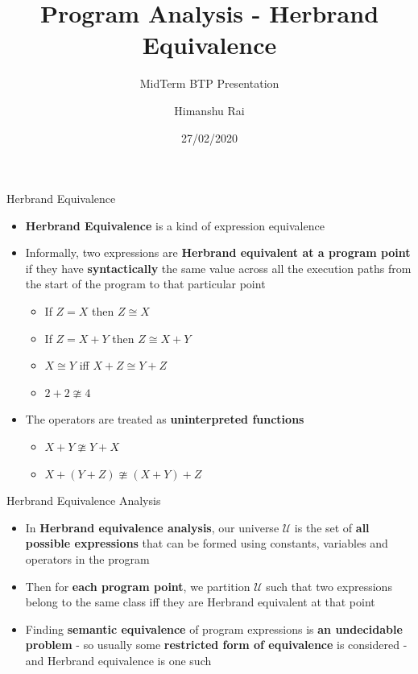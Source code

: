 \documentclass[11pt]{beamer}
\title{Program Analysis - Herbrand Equivalence}
\subtitle{MidTerm BTP Presentation}
\author{Himanshu Rai}
\institute{Indian Institute of Technology, Palakkad}
\date{27/02/2020}
\begin{document}
\begin{frame}
\titlepage
\end{frame}

\begin{frame}{Herbrand Equivalence}
    \begin{itemize}
        \item \textbf{Herbrand Equivalence} is a kind of expression equivalence
        \item Informally, two expressions are \textbf{Herbrand equivalent at a program point} if they have \textbf{syntactically} the same value across all the execution paths from the start of the program to that particular point
        \begin{itemize}
            \item If $Z = X$ then $Z \cong X$
            \item If $Z = X + Y$ then $Z \cong X + Y$
            \item $X \cong Y$ iff $X + Z \cong Y + Z$
            \item $2 + 2 \ncong 4$
        \end{itemize}
        \item The operators are treated as \textbf{uninterpreted functions}
        \begin{itemize}
            \item $X + Y \ncong Y + X$
            \item $X + (Y + Z) \ncong (X + Y) + Z$
        \end{itemize}
    \end{itemize}
\end{frame}

\begin{frame}{Herbrand Equivalence Analysis}
    \begin{itemize}
        \item In \textbf{Herbrand equivalence analysis}, our universe $\mathcal U$ is the set of \textbf{all possible expressions} that can be formed using constants, variables and operators in the program
        \item Then for \textbf{each program point}, we partition $\mathcal U$ such that two expressions belong to the same class iff they are Herbrand equivalent at that point
        \item Finding \textbf{semantic equivalence} of program expressions is \textbf{an undecidable problem} - so usually some \textbf{restricted form of equivalence} is considered - and Herbrand equivalence is one such
    \end{itemize}
\end{frame}
\end{document}
